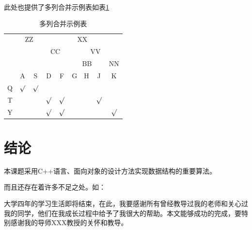 \documentclass{ctexart}
\begin{document}
	此处也提供了多列合并示例表如表\ref{duoliehebing}
	\begin{table}[htbp]
		\small
		\centering
		\caption{多列合并示例表}
		\begin{tabular}{ccccccccc}
			& \multicolumn{2}{c}{ZZ}& \multicolumn{6}{c}{XX}\\ 
			
			\cmidrule(lr){2-3} \cmidrule(lr){4-9}
			&   &   & \multicolumn{2}{c}{CC}&\multicolumn{4}{c}{VV}\\ 
			\cmidrule(lr){4-5} \cmidrule(lr){6-9}
			&   &   &   &   & \multicolumn{3}{c}{BB}&NN\\
			\cmidrule(lr){6-8} \cmidrule(lr){9-9}
			& A &S	&D &F &G &H &J &K \\ \midrule
			Q&$\surd$&$\surd$&   &   &   &    & &\\
			T&	&		& $\surd$ & $\surd$   &   &  &$\surd$     &\\
			Y&	&		& $\surd$ & $\surd$   &   &  &    &$\surd$ \\ \bottomrule
		\end{tabular}
		\label{duoliehebing}
	\end{table}

\section{结论}
	本课题采用C++语言、面向对象的设计方法实现数据结构的重要算法。
	
	而且还存在着许多不足之处。如：
	
\begin{thankpage}
	大学四年的学习生活即将结束，在此，我要感谢所有曾经教导过我的老师和关心过我的同学，他们在我成长过程中给予了我很大的帮助。本文能够成功的完成，要特别感谢我的导师XXX教授的关怀和教导。

\end{thankpage}

\end{document}
